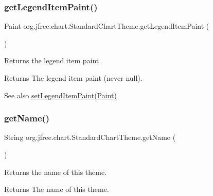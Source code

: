 \subsubsection{\texorpdfstring{get\+Legend\+Item\+Paint()}{getLegendItemPaint()}}
{\footnotesize\ttfamily Paint org.\+jfree.\+chart.\+Standard\+Chart\+Theme.\+get\+Legend\+Item\+Paint (\begin{DoxyParamCaption}{ }\end{DoxyParamCaption})}

Returns the legend item paint.

\begin{DoxyReturn}{Returns}
The legend item paint (never {\ttfamily null}).
\end{DoxyReturn}
\begin{DoxySeeAlso}{See also}
\mbox{\hyperlink{classorg_1_1jfree_1_1chart_1_1_standard_chart_theme_aad77d72f359f37a618c34d0f404b00fa}{set\+Legend\+Item\+Paint(\+Paint)}} 
\end{DoxySeeAlso}
\mbox{\label{classorg_1_1jfree_1_1chart_1_1_standard_chart_theme_abd78360170f9a355ebc5e80ea3ea064e}} 
\subsubsection{\texorpdfstring{get\+Name()}{getName()}}
{\footnotesize\ttfamily String org.\+jfree.\+chart.\+Standard\+Chart\+Theme.\+get\+Name (\begin{DoxyParamCaption}{ }\end{DoxyParamCaption})}

Returns the name of this theme.

\begin{DoxyReturn}{Returns}
The name of this theme. 
\end{DoxyReturn}
\mbox{\label{classorg_1_1jfree_1_1chart_1_1_standard_chart_theme_a2aa18220fcadb8ebd8f099644ea2ef2d}} 
